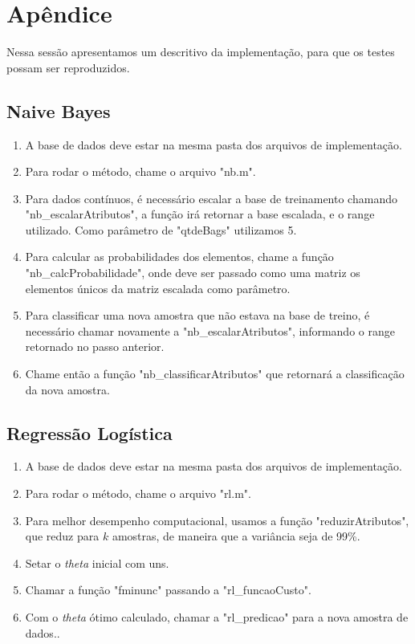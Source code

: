 \documentclass[10pt, conference, compsocconf]{IEEEtran}
\begin{document}


\newpage
\section{Apêndice}
Nessa sessão apresentamos um descritivo da implementação, para que os testes possam ser reproduzidos.

\subsection{Naive Bayes}
\begin{enumerate}
\item A base de dados deve estar na mesma pasta dos arquivos de implementação.
\item Para rodar o método, chame o arquivo "nb.m".
\item Para dados contínuos, é necessário escalar a base de treinamento chamando "nb\_escalarAtributos", a função irá retornar a base escalada, e o range utilizado. Como parâmetro de "qtdeBags" utilizamos 5.
\item Para calcular as probabilidades dos elementos, chame a função "nb\_calcProbabilidade", onde deve ser passado como uma matriz os elementos únicos da matriz escalada como parâmetro.
\item Para classificar uma nova amostra que não estava na base de treino, é necessário chamar novamente a "nb\_escalarAtributos", informando o range retornado no passo anterior.
\item Chame então a função "nb\_classificarAtributos" que retornará a classificação da nova amostra.
\end{enumerate}

\subsection{Regressão Logística}
\begin{enumerate}
\item A base de dados deve estar na mesma pasta dos arquivos de implementação.
\item Para rodar o método, chame o arquivo "rl.m".
\item Para melhor desempenho computacional, usamos a função "reduzirAtributos", que reduz para $k$ amostras, de maneira que a variância seja de 99\%.
\item Setar o \textit{theta} inicial com uns.
\item Chamar a função "fminunc" passando a "rl\_funcaoCusto".
\item Com o \textit{theta} ótimo calculado, chamar a "rl\_predicao" para a nova amostra de dados..
\end{enumerate}
\end{document}
